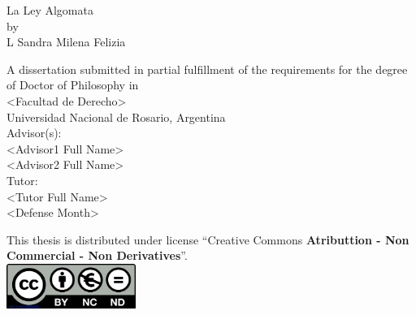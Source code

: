\documentclass[12pt]{report} %
\begin{document}
 
\begin{titlepage}
	\begin{center}
		\begin{Huge}
			La Ley Algomata\\			
			\bigskip
			by\\L
			\bigskip
			Sandra Milena Felizia\\
		\end{Huge}
	    \vspace{4cm}	
	    \begin{Large}
            A dissertation submitted in partial fulfillment of the requirements for the degree of Doctor of Philosophy in\\
            \bigskip
            <Facultad de Derecho>\\
                    \vspace{2cm}
                    Universidad Nacional de Rosario, Argentina\\
                    \vspace{3cm}
                    Advisor(s):\\
                    \bigskip
                    <Advisor1 Full Name>\\
                    <Advisor2 Full Name>\\
                    \bigskip
                    Tutor:\\
                    \bigskip
                    <Tutor Full Name>\\
                    \bigskip
                    <Defense Month>\\
                 \end{Large}

        \end{center}
        \end{titlepage}
	
	\thispagestyle{empty}
	\vspace*{\fill}
	\begin{center}
	This thesis is distributed under license ``Creative Commons \textbf{Atributtion - Non Commercial - Non Derivatives}''.\\
	\medskip
	\includegraphics[width=4.2cm]{creativecommons.png} %
	\end{center}
	
\end{document}
